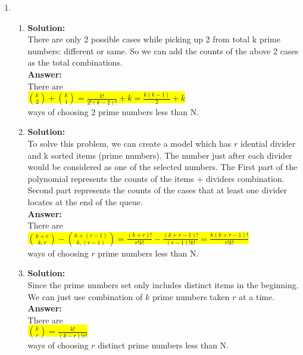 \documentclass{article}
\begin{document}
\thispagestyle{fancy} %

\newcommand{\myansw}{\textbf{Answer:}\\}

\newcommand{\mysolu}{\textbf{Solution:}\\}

\begin{enumerate}


	\item 
	
	\begin{enumerate}
		\item
		\mysolu
		There are only 2 possible cases while picking up 2 from total k prime numbers: different or same. So we can add the counts of the above 2 cases as the total combinations.\\
		\myansw
		There are \\
		\colorbox{yellow}{
			${ {k \choose 2} + {k \choose 1} = \frac{k!}{2!(k-2)!}+k=\frac{k(k-1)}{2}+k}$
		}\\
		ways of choosing 2 prime numbers less than N.\\
			
		\item
		\mysolu
		To solve this problem, we can create a model which has ${r}$ idential divider and k sorted items (prime numbers). The number just after each divider would be considered as one of the selected numbers. The  First part of the polynomial represents the counts of the items + dividers combination. Second part represents the counts of the cases that at least one divider locates at the end of the queue.\\
		\myansw
		There are\\
		\colorbox{yellow}{
			${  {k+r \choose k,r}  - {k+(r-1) \choose k, (r-1)}= \frac{(k+r)!}{r!k!}-\frac{(k+r-1)!}{(r-1)!k!} = \frac{k(k+r-1)!}{r!k!}}$
		}\\
		ways of choosing ${r}$ prime numbers less than N.\\
		
		\item
		\mysolu
		Since the prime numbers set only includes distinct items in the beginning. We can just use combination of ${k}$ prime numbers taken ${r}$ at a time.\\
				\myansw
		There are\\
		\colorbox{yellow}{
			${{k \choose r}=\frac{k!}{(k-r)!r!}}$
		}\\
		ways of choosing ${r}$ distinct prime numbers less than N.\\


\end{enumerate}
\end{enumerate}
\end{document}
